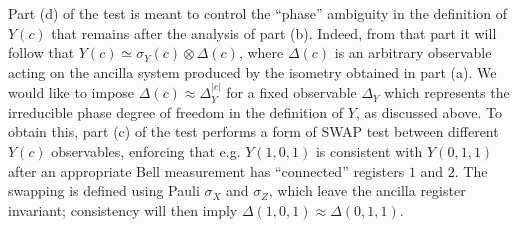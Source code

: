Part (d) of the test is meant to control the ``phase'' ambiguity in the definition of $Y(c)$ that remains after the analysis of part (b). Indeed, from that part it will follow that $Y(c) \simeq \sigma_Y(c) \otimes \Delta(c)$, where $\Delta(c)$ is an arbitrary observable acting on the ancilla system produced by the isometry obtained in part (a). We would like to impose $\Delta(c) \approx \Delta_Y^{|c|}$ for a fixed observable $\Delta_Y$ which  represents the irreducible phase degree of freedom in the definition of $Y$, as discussed above. To obtain this, part (c) of the test performs a form of SWAP test between different $Y(c)$ observables, enforcing that e.g. $Y(1,0,1)$ is consistent with $Y(0,1,1)$ after an appropriate Bell measurement has ``connected'' registers $1$ and $2$. The swapping is defined using Pauli $\sigma_X$ and $\sigma_Z$, which leave the ancilla register invariant; consistency will then imply $\Delta(1,0,1) \approx \Delta(0,1,1)$.  


